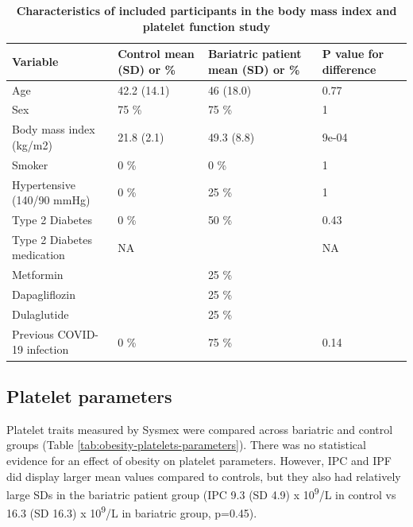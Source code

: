 \documentclass[11pt,twoside]{bristolthesis}
\begin{document}
\begin{table}

\caption[Characteristics of included participants in the body mass index and platelet function study]{\label{tab:obesity-platelets-participants}\textbf{Characteristics of included participants in the body mass index and platelet function study}}
\centering
\begin{tabu} to 
\toprule
Variable & Control mean (SD) or \% & Bariatric patient mean (SD) or \% & P value for difference\\
\midrule
Age & 42.2 (14.1) & 46 (18.0) & 0.77\\
Sex & 75 \% & 75 \% & 1\\
Body mass index (kg/m2) & 21.8 (2.1) & 49.3 (8.8) & 9e-04\\
Smoker & 0 \% & 0 \% & 1\\
Hypertensive (140/90 mmHg) & 0 \% & 25 \% & 1\\
\addlinespace
Type 2 Diabetes & 0 \% & 50 \% & 0.43\\
Type 2 Diabetes medication & NA &  & NA\\
\hspace{1em}Metformin &  & 25 \% & \\
\hspace{1em}Dapagliflozin &  & 25 \% & \\
\hspace{1em}Dulaglutide &  & 25 \% & \\
\addlinespace
Previous COVID-19 infection & 0 \% & 75 \% & 0.14\\
\bottomrule
\end{tabu}
\end{table}
\hypertarget{platelet-parameters}{%
\subsection{Platelet parameters}\label{platelet-parameters}}

Platelet traits measured by Sysmex were compared across bariatric and control groups (Table \ref{tab:obesity-platelets-parameters}). There was no statistical evidence for an effect of obesity on platelet parameters. However, IPC and IPF did display larger mean values compared to controls, but they also had relatively large SDs in the bariatric patient group (IPC 9.3 (SD 4.9) x 10\textsuperscript{9}/L in control vs 16.3 (SD 16.3) x 10\textsuperscript{9}/L in bariatric group, p=0.45).
\end{document}
